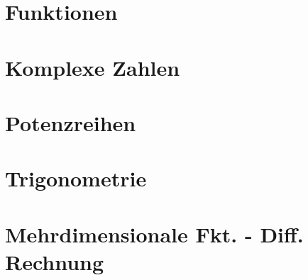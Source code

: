 \documentclass[numerate]{cheatsheet}
\author{Micha Bosshart - bmicha@ethz.ch \\ \vspace*{0.2em} \normalsize{ergänzt von Noa Sendlhofer \& Christian Leser} \vspace*{-0.2em}}
\begin{document}
    \section{Funktionen}
        
        
        
        
    \section{Komplexe Zahlen}
        
        
        
    \section{Potenzreihen}
        
        
        
    \section{Trigonometrie}
        
        
        
        \vfill \null \columnbreak
    \section{Mehrdimensionale Fkt. - Diff. Rechnung}
        
        
        
        \vfill \null \columnbreak
        
        
        
        
        
        
        \vfill \null \columnbreak
\end{document}

